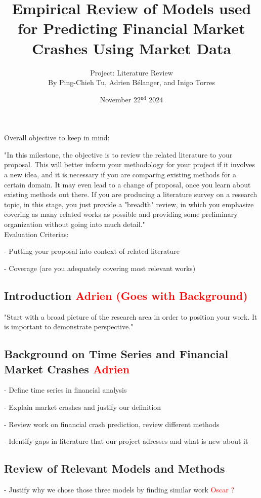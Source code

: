 \documentclass[12pt, letterpaper]{article}
\title{Empirical Review of Models used for Predicting Financial Market Crashes Using Market Data}
\author{\large Project: Literature Review \vspace{0.75em} \\ \normalsize By Ping-Chieh Tu, Adrien Bélanger, and Inigo Torres}
\date{November 22$^{\text{nd}}$ 2024}
\begin{document}
\maketitle 

\justifying %

Overall objective to keep in mind:

"In this milestone, the objective is to review the related literature to your proposal. This will better inform your methodology for your project if it involves a new idea, and it is necessary if you are comparing existing methods for a certain domain. It may even lead to a change of proposal, once you learn about existing methods out there. If you are producing a literature survey on a research topic, in this stage, you just provide a "breadth" review, in which you emphasize covering as many related works as possible and providing some preliminary organization without going into much detail."\\

Evaluation Criterias:

- Putting your proposal into context of related literature

- Coverage (are you adequately covering most relevant works)

\subsection*{Introduction \textcolor{red}{Adrien (Goes with Background)} }
"Start with a broad picture of the research area in order to position your work. It is important to demonstrate perspective."

\subsection*{Background on Time Series and Financial Market Crashes \textcolor{red}{Adrien}}

- Define time series in financial analysis

\cite{}

- Explain market crashes and justify our definition

- Review work on financial crash prediction, review different methods

- Identify gaps in literature that our project adresses and what is new about it

\subsection*{Review of Relevant Models and Methods }
- Justify why we chose those three models by finding similar work \textcolor{red}{Oscar ?}
\end{document}

